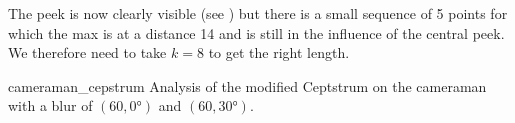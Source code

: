 The peek is now clearly visible (see ) but
there is a small sequence of 5 points for which the max is at a distance
14 and is still in the influence of the central peek.
We therefore need to take $k = 8$ to get the right length.

\begin{myfig}{cameraman_cepstrum}
  {Analysis of the modified Ceptstrum on the cameraman with a blur of $(60,\ang{0})$ and $(60,\ang{30})$.}
\end{myfig}
